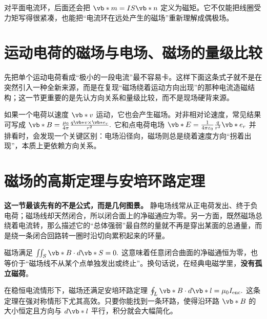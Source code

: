 \documentclass[lang=cn,11pt]{elegantbook}
\begin{document}
对平面电流环，后面还会把
 \(\vb*{m}=IS\vb*{n}\) 
定义为磁矩。它不仅能把线圈受力矩写得很紧凑，也能把“电流环在远处产生的磁场”重新理解成偶极场。

\begin{center}
\end{center}

\section{运动电荷的磁场与电场、磁场的量级比较}

先把单个运动电荷看成“极小的一段电流”最不容易卡。这样下面这条式子就不是在突然引入一种全新来源，而是在复现“磁场绕着运动方向出现”的那种电流造磁结构；这一节更重要的是先认方向关系和量级比较，而不是现场硬背来源。

如果一个电荷以速度 \(\vb*{v}\) 运动，它也会产生磁场。对非相对论速度，常见结果可写成
 \(\vb*{B} =\frac{\mu_0}{4\pi}\frac{q\vb*{v}\times \vb*{e}_r}{r^2}.\) 
它和点电荷电场
 \(\vb*{E} =\frac{1}{4\pi\varepsilon_0}\frac{q}{r^2}\vb*{e}_r\) 
并排看时，会发现一个关键区别：电场沿径向，磁场则总是绕着速度方向“拐着出现”，本质上更依赖方向关系。

\section{磁场的高斯定理与安培环路定理}

\textbf{这一节最该先有的不是公式，而是几何图景。} 静电场线常从正电荷发出、终于负电荷；磁场线却天然闭合，所以闭合面上的净磁通应为零。另一方面，既然磁场总绕着电流转，那么描述它的“总体强弱”最自然的量就不再是穿出某面的总通量，而是绕一条闭合回路转一圈时沿切向累积起来的环量。

磁场满足
 \(\iint_S \vb*{B}\cdot d\vb*{S}=0.\) 
这意味着任意闭合曲面的净磁通恒为零，也等价于“磁场线不从某个点单独发出或终止”。换句话说，在经典电磁学里，\textbf{没有孤立磁荷}。

在稳恒电流情形下，磁场还满足安培环路定理
 \(\oint_L \vb*{B}\cdot d\vb*{l} =\mu_0 I_{\mathrm{enc}}.\) 
这条定理在强对称情形下尤其高效。只要你能找到一条环路，使得沿环路 \(\vb*{B}\) 的大小恒定且方向与 \(d\vb*{l}\) 平行，积分就会大幅简化。
\end{document}
